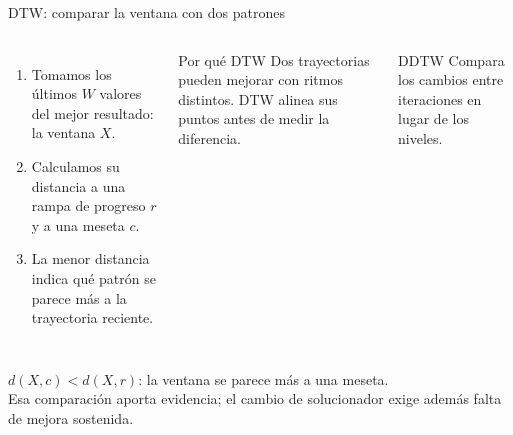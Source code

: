 \documentclass[aspectratio=169,11pt]{beamer}
\begin{document}
\begin{frame}{DTW: comparar la ventana con dos patrones}
  \begin{columns}[T,onlytextwidth]
      \begin{enumerate}
        \setlength{\itemsep}{0.30cm}
        \item Tomamos los últimos $W$ valores del mejor resultado: la ventana $X$.
        \item Calculamos su distancia a una rampa de progreso $r$ y a una meseta $c$.
        \item La menor distancia indica qué patrón se parece más a la trayectoria reciente.
      \end{enumerate}

      \begin{block}{Por qué DTW}
        \small Dos trayectorias pueden mejorar con ritmos distintos.
        DTW alinea sus puntos antes de medir la diferencia.
      \end{block}
      \vspace{0.18cm}
      \begin{exampleblock}{DDTW}
        \small Compara los cambios entre iteraciones en lugar de los niveles.
      \end{exampleblock}
  \end{columns}

  \vspace{0.30cm}
  \centering
  {\small $d(X,c)<d(X,r)$: la ventana se parece más a una meseta.}\\[0.12cm]
  {\footnotesize Esa comparación aporta evidencia; el cambio de solucionador exige además falta de mejora sostenida.}
\end{frame}
\end{document}
